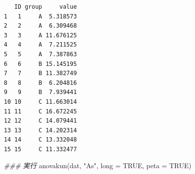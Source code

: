 \documentclass[
  a4paper,
]{ltjsbook}
\newenvironment{Shaded}{\begin{snugshade}}{\end{snugshade}}
\newcommand{\AttributeTok}[1]{\textcolor[rgb]{0.40,0.45,0.13}{#1}}
\newcommand{\ConstantTok}[1]{\textcolor[rgb]{0.56,0.35,0.01}{#1}}
\newcommand{\DocumentationTok}[1]{\textcolor[rgb]{0.37,0.37,0.37}{\textit{#1}}}
\newcommand{\FunctionTok}[1]{\textcolor[rgb]{0.28,0.35,0.67}{#1}}
\newcommand{\NormalTok}[1]{\textcolor[rgb]{0.00,0.23,0.31}{#1}}
\newcommand{\StringTok}[1]{\textcolor[rgb]{0.13,0.47,0.30}{#1}}
\begin{document}
\begin{verbatim}
   ID group     value
1   1     A  5.318573
2   2     A  6.309468
3   3     A 11.676125
4   4     A  7.211525
5   5     A  7.387863
6   6     B 15.145195
7   7     B 11.382749
8   8     B  6.204816
9   9     B  7.939441
10 10     C 11.663014
11 11     C 16.672245
12 12     C 14.079441
13 13     C 14.202314
14 14     C 13.332048
15 15     C 11.332477
\end{verbatim}

\begin{Shaded}
\begin{Highlighting}[]
\DocumentationTok{\#\#\# 実行}
\FunctionTok{anovakun}\NormalTok{(dat, }\StringTok{"As"}\NormalTok{, }\AttributeTok{long =} \ConstantTok{TRUE}\NormalTok{, }\AttributeTok{peta =} \ConstantTok{TRUE}\NormalTok{)}
\end{Highlighting}
\end{Shaded}
\end{document}
